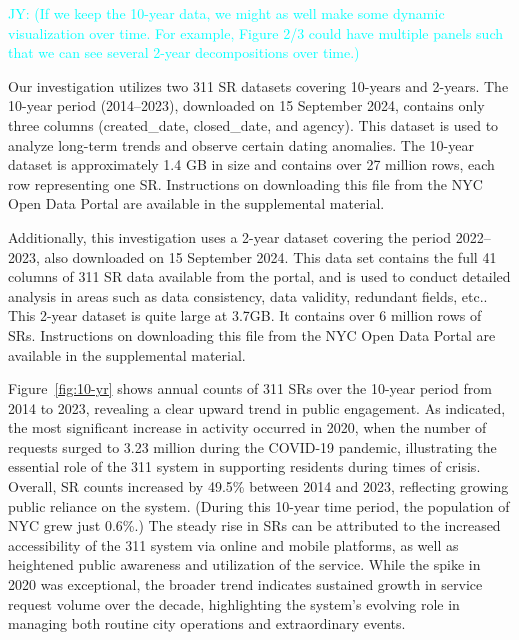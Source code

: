 \documentclass[linenumber]{jdsart}
\newcommand{\jy}[1]{\textcolor{cyan}{JY: (#1)}}
\begin{document}
\jy{If we keep the 10-year data, we might as well make some dynamic
  visualization over time. For example, Figure 2/3 could have multiple
  panels such that we can see several 2-year decompositions over
  time.}


Our investigation utilizes two 311 SR datasets covering 10-years and 2-years.
The 10-year period (2014--2023), downloaded on 15 September 2024, 
contains only three columns (created\_date, closed\_date, and 
agency). This dataset is used to analyze long-term 
trends and observe certain dating anomalies. The 10-year dataset is approximately 
1.4 GB in size and contains over 27 million rows, each row representing one SR.
 Instructions on downloading this file from the NYC Open Data Portal 
 are available in the supplemental material.


Additionally, this investigation uses a 2-year dataset covering the period
2022--2023, also downloaded on 15 September 2024. This data set 
contains the full 41 columns of 311 SR data available from the portal, 
and is used to conduct detailed analysis in areas such as data consistency, 
data validity, redundant fields, etc.. This 2-year dataset 
is quite large at 3.7GB. It contains over 6 million rows of SRs. Instructions 
on downloading this file from the NYC Open Data Portal are 
available in the supplemental material.


Figure~\ref{fig:10-yr} shows  annual counts of 311 SRs over the
10-year period from 2014 to 2023, revealing a clear upward trend in
public engagement. As indicated, the most significant increase
in activity occurred in 2020, when the number of requests surged to 3.23 million
during the COVID-19 pandemic, illustrating the essential role of the
311 system in supporting residents during times of crisis. Overall, SR
counts increased by 49.5\% between 2014 and 2023, reflecting
growing public reliance on the system. (During this 10-year time 
period, the population of NYC grew just 0.6\%.) The steady 
rise in SRs can be attributed to the increased accessibility of 
the 311 system via online and mobile platforms, as well as 
heightened public awareness  and utilization of the service. 
While the spike in 2020 was exceptional, the broader trend 
indicates sustained growth in service request volume over 
the decade, highlighting the system's evolving role in managing 
both routine city operations and extraordinary events.
\end{document}
